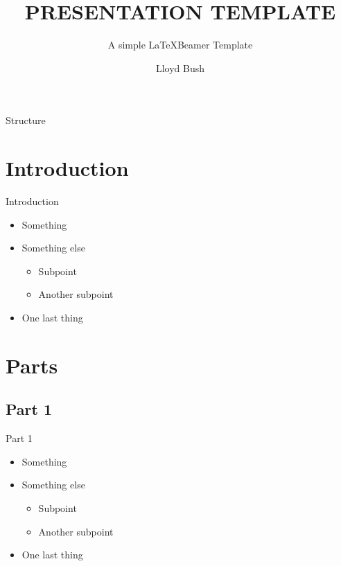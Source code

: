 \documentclass[aspectratio=169,t]{beamer}
\title{PRESENTATION TEMPLATE}
\subtitle{A simple \LaTeX Beamer Template}
\author{Lloyd Bush}
\institute{Gymnasium Dresden-Bühlau}
\date{}
\begin{document}
    \begin{frame}
        \titlepage
    \end{frame}

    \begin{frame}{Structure}
        \begin{Large}
            \tableofcontents[pausesections]
        \end{Large}
    \end{frame}

    \section{Introduction}
    \begin{frame}{Introduction}
        \begin{itemize}
            \pause
            \item Something
            \pause
            \item Something else
            \begin{itemize}
                \item Subpoint
                \item Another subpoint
            \end{itemize}
            \pause
            \item One last thing
        \end{itemize}
    \end{frame}

    \section{Parts}
    \subsection{Part 1}
    \begin{frame}{Part 1}
        \begin{itemize}
            \pause
            \item Something
            \pause
            \item Something else
            \begin{itemize}
                \item Subpoint
                \item Another subpoint
            \end{itemize}
            \pause
            \item One last thing
        \end{itemize}
    \end{frame}
\end{document}
